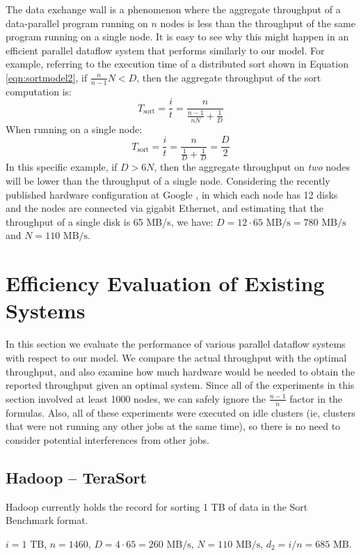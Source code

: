 \documentclass{acm_proc_article-sp}
\begin{document}
The data exchange wall is a phenomenon where the aggregate throughput of a
data-parallel program running on $n$ nodes is less than the throughput of the
same program running on a single node. It is easy to see why this might happen
in an efficient parallel dataflow system that performs similarly to our model.
For example, referring to the execution time of a distributed sort shown in
Equation \ref{eqn:sortmodel2}, if $\frac{n}{n-1} N < D$, then the aggregate
throughput of the sort computation is: \[T_\text{sort} = \frac{i}{t} =
\frac{n}{\frac{n-1}{n N} + \frac{1}{D}}\] When running on a single node:
\[T_\text{sort} = \frac{i}{t} = \frac{n}{\frac{1}{D} + \frac{1}{D}} =
\frac{D}{2}\] In this specific example, if $D > 6 N$, then the aggregate
throughput on \emph{two} nodes will be lower than the throughput of a single
node. Considering the recently published hardware configuration at Google
\cite{sorting1pb}, in which each node has 12 disks and the nodes are connected
via gigabit Ethernet, and estimating that the throughput of a single disk is 65
MB/s, we have: $D = 12 \cdot 65 \text{ MB/s} = 780 \text{ MB/s}$ and $N = 110
\text{ MB/s}$.

\section{Efficiency Evaluation of Existing Systems}

In this section we evaluate the performance of various parallel dataflow
systems with respect to our model. We compare the actual throughput with the
optimal throughput, and also examine how much hardware would be needed
to obtain the reported throughput given an optimal system. Since all of the
experiments in this section involved at least 1000 nodes, we can safely ignore
the $\frac{n-1}{n}$ factor in the formulas. Also, all of these experiments
were executed on idle clusters (ie, clusters that were not running any other
jobs at the same time), so there is no need to consider potential interferences
from other jobs.

\subsection{Hadoop -- TeraSort}

Hadoop currently holds the record \cite{hadoop2009} for sorting 1 TB of data in the Sort Benchmark \cite{sortbenchmark} format.

$i = 1 \text{ TB}$, $n = 1460$, $D = 4 \cdot 65 = 260 \text{ MB/s}$, $N = 110 \text{ MB/s}$, $d_2 = i/n = 685 \text{ MB}$.
\end{document}
